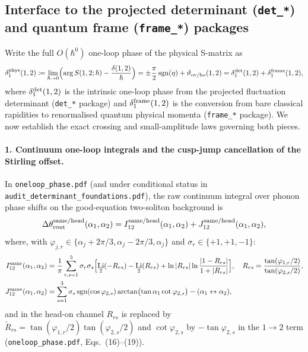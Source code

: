 \documentclass[11pt,a4paper]{article}
\DeclareMathOperator{\Li}{Li}
\DeclareMathOperator{\sgn}{sgn}
\theoremstyle{remark}
\begin{document}
\subsection{Interface to the projected determinant (\texttt{det\_*}) and quantum frame (\texttt{frame\_*}) packages}
Write the full $O(\hbar^0)$ one-loop phase of the physical S-matrix as
\begin{equation}\label{eq:delta1_phys_split}
\delta_1^{\rm phys}(1,2)\coloneqq \lim_{\hbar\to 0}\Bigl(\arg S(1,2;\hbar)-\frac{\delta(1,2)}{\hbar}\Bigr)
=\pm\frac\pi2\sgn(\eta)+\vartheta_{\rm ov/ho}(1,2)
=\delta_1^{\rm det}(1,2)+\delta_1^{\rm frame}(1,2),
\end{equation}
where $\delta_1^{\rm det}(1,2)$ is the intrinsic one-loop phase from the projected fluctuation determinant (\texttt{det\_*} package) and $\delta_1^{\rm frame}(1,2)$ is the conversion from bare classical rapidities to renormalised quantum physical momenta (\texttt{frame\_*} package). We now establish the exact crossing and small-amplitude laws governing both pieces.

\paragraph{1. Continuum one-loop integrals and the cusp-jump cancellation of the Stirling offset.}
In \texttt{oneloop\_phase.pdf} (and under conditional status in \texttt{audit\_determinant\_foundations.pdf}), the raw continuum integral over phonon phase shifts on the good-equation two-soliton background is
\begin{equation}\label{eq:Delta_theta_cont}
\Delta\theta_{\rm cont}^{\rm same/head}(\alpha_1,\alpha_2)=I_{12}^{\rm same/head}(\alpha_1,\alpha_2)+J_{12}^{\rm same/head}(\alpha_1,\alpha_2),
\end{equation}
where, with $\varphi_{j,r}\in\{\alpha_j+2\pi/3,\alpha_j-2\pi/3,\alpha_j\}$ and $\sigma_r\in\{+1,+1,-1\}$:
\begin{align}
I_{12}^{\rm same}(\alpha_1,\alpha_2)&=\frac{1}{\pi}\sum_{r,s=1}^3\sigma_r\sigma_s\Bigl[\Li_2(-R_{rs})-\Li_2(R_{rs})+\ln|R_{rs}|\ln\frac{|1-R_{rs}|}{1+|R_{rs}|}\Bigr],\quad R_{rs}=\frac{\tan(\varphi_{1,r}/2)}{\tan(\varphi_{2,s}/2)},\label{eq:I12_same}\\
J_{12}^{\rm same}(\alpha_1,\alpha_2)&=\sum_{s=1}^3\sigma_s\sgn(\cos\varphi_{2,s})\arctan\bigl(\tan\alpha_1\cot\varphi_{2,s}\bigr)-(\alpha_1\leftrightarrow\alpha_2),\label{eq:J12_same}
\end{align}
and in the head-on channel $R_{rs}$ is replaced by $\tilde R_{rs}=\tan(\varphi_{1,r}/2)\tan(\varphi_{2,s}/2)$ and $\cot\varphi_{2,s}$ by $-\tan\varphi_{2,s}$ in the $1\to 2$ term (\texttt{oneloop\_phase.pdf}, Eqs.~(16)--(19)).
\end{document}
